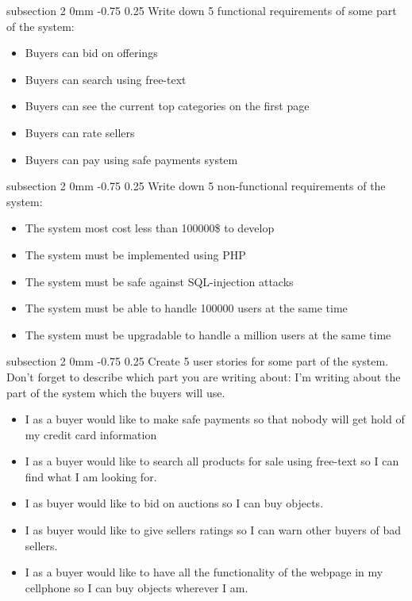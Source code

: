 \documentclass[a4paper,11pt]{article}
\makeatletter
\renewcommand{\subsection}{\@startsection
   {subsection}%
   {2}%
   {0mm}%
   {-0.75\baselineskip}%
   {0.25\baselineskip}%
   {\rmfamily\normalfont\slshape\normalsize}}%
\makeatother
\begin{document}
\subsection{Write down 5 functional requirements of some part of the system:}
\begin{itemize}
  \item Buyers can bid on offerings
  \item Buyers can search using free-text
  \item Buyers can see the current top categories on the first page
  \item Buyers can rate sellers
  \item Buyers can pay using safe payments system 
\end{itemize}
\subsection{Write down 5 non-functional requirements of the system:}
\begin{itemize}
  \item The system most cost less than 100000\$ to develop
  \item The system must be implemented using PHP
  \item The system must be safe against SQL-injection attacks
  \item The system must be able to handle 100000 users at the same time
  \item The system must be upgradable to handle a million users at the same time 
\end{itemize}
\subsection{Create 5 user stories for some part of the system. Don’t forget to describe which part you are writing about:}
 I'm writing about the part of the system which the buyers will use. 
\begin{itemize}
  \item I as a buyer would like to make safe payments so that nobody will get hold of my credit card information
  \item I as a buyer would like to search all products for sale using free-text so I can find what I am looking for.
  \item I as buyer would like to bid on auctions so I can buy objects.
  \item I as buyer would like to give sellers ratings so I can warn other buyers of bad sellers.
  \item I as a buyer would like to have all the functionality of the webpage in my cellphone so I can buy objects wherever I am.
\end{itemize}
\end{document}
